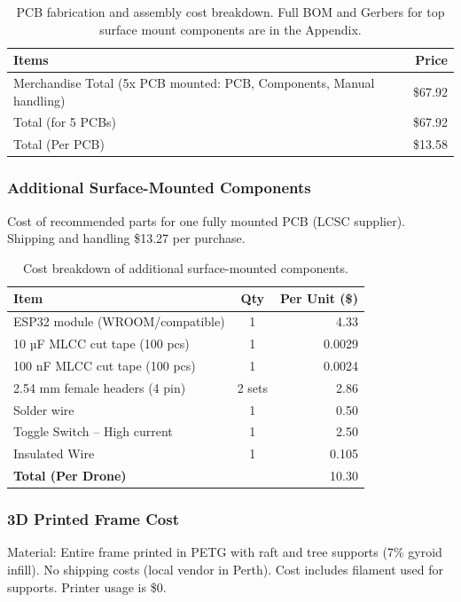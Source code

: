 \begin{table}[H]
\centering
\begin{tabular}{l r}
\toprule
\textbf{Items} & \textbf{Price} \\
\midrule
Merchandise Total (5x PCB mounted: PCB, Components, Manual handling) & \$67.92 \\
Total (for 5 PCBs) & \$67.92 \\
Total (Per PCB) & \$13.58 \\
\bottomrule
\end{tabular}
\caption{PCB fabrication and assembly cost breakdown. Full BOM and Gerbers for top surface mount components are in the Appendix.}
\end{table}

\subsubsection{Additional Surface-Mounted Components}

Cost of recommended parts for one fully mounted PCB (LCSC supplier). Shipping and handling \$13.27 per purchase.

\begin{table}[H]
\centering
\begin{tabular}{l c r}
\toprule
\textbf{Item} & \textbf{Qty} & \textbf{Per Unit (\$)} \\
\midrule
ESP32 module (WROOM/compatible) & 1 & 4.33 \\
10 µF MLCC cut tape (100 pcs) & 1 & 0.0029 \\
100 nF MLCC cut tape (100 pcs) & 1 & 0.0024 \\
2.54 mm female headers (4 pin) & 2 sets & 2.86 \\
Solder wire & 1 & 0.50 \\
Toggle Switch – High current & 1 & 2.50 \\
Insulated Wire & 1 & 0.105 \\
\midrule
\textbf{Total (Per Drone)} & & 10.30 \\
\bottomrule
\end{tabular}
\caption{Cost breakdown of additional surface-mounted components.}
\end{table}

\pagebreak
\subsubsection{3D Printed Frame Cost}

Material: Entire frame printed in PETG with raft and tree supports (7\% gyroid infill). No shipping costs (local vendor in Perth). Cost includes filament used for supports. Printer usage is \$0.

